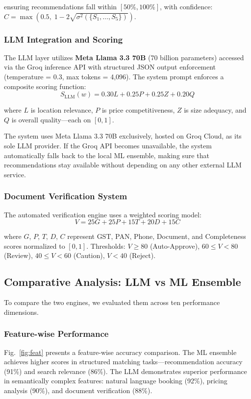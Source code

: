 \documentclass[conference]{IEEEtran}
\begin{document}
\noindent ensuring recommendations fall within $[50\%, 100\%]$, with confidence: $C = \max(0.5,\; 1 - 2\sqrt{\sigma^2(\{S_1, \ldots, S_5\})})$.

\subsubsection{LLM Integration and Scoring}
The LLM layer utilizes \textbf{Meta Llama 3.3 70B} (70 billion parameters) accessed via the Groq inference API with structured JSON output enforcement (temperature = 0.3, max tokens = 4,096). The system prompt enforces a composite scoring function:
\begin{equation}
S_{\text{LLM}}(w) = 0.30L + 0.25P + 0.25Z + 0.20Q
\label{eq:llm}
\end{equation}

\noindent where $L$ is location relevance, $P$ is price competitiveness, $Z$ is size adequacy, and $Q$ is overall quality---each on $[0, 1]$.

The system uses Meta Llama 3.3 70B exclusively, hosted on Groq Cloud, as its sole LLM provider. If the Groq API becomes unavailable, the system automatically falls back to the local ML ensemble, making sure that recommendations stay available without depending on any other external LLM service.

\subsubsection{Document Verification System}
The automated verification engine uses a weighted scoring model:
\begin{equation}
V = 25G + 25P + 15T + 20D + 15C
\label{eq:verify}
\end{equation}

\noindent where $G$, $P$, $T$, $D$, $C$ represent GST, PAN, Phone, Document, and Completeness scores normalized to $[0,1]$. Thresholds: $V \geq 80$ (Auto-Approve), $60 \leq V < 80$ (Review), $40 \leq V < 60$ (Caution), $V < 40$ (Reject).

\subsection{Comparative Analysis: LLM vs ML Ensemble}
To compare the two engines, we evaluated them across ten performance dimensions.

\subsubsection{Feature-wise Performance}
Fig.~\ref{fig:feat} presents a feature-wise accuracy comparison. The ML ensemble achieves higher scores in structured matching tasks---recommendation accuracy (91\%) and search relevance (86\%). The LLM demonstrates superior performance in semantically complex features: natural language booking (92\%), pricing analysis (90\%), and document verification (88\%).
\end{document}
